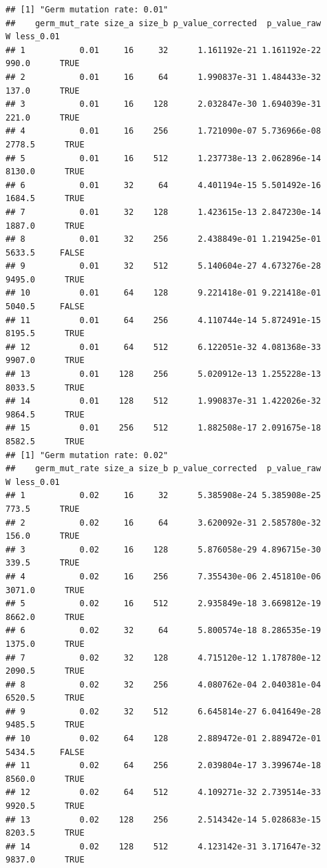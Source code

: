 \documentclass[
]{book}
\begin{document}
\begin{verbatim}
## [1] "Germ mutation rate: 0.01"
##    germ_mut_rate size_a size_b p_value_corrected  p_value_raw      W less_0.01
## 1           0.01     16     32      1.161192e-21 1.161192e-22  990.0      TRUE
## 2           0.01     16     64      1.990837e-31 1.484433e-32  137.0      TRUE
## 3           0.01     16    128      2.032847e-30 1.694039e-31  221.0      TRUE
## 4           0.01     16    256      1.721090e-07 5.736966e-08 2778.5      TRUE
## 5           0.01     16    512      1.237738e-13 2.062896e-14 8130.0      TRUE
## 6           0.01     32     64      4.401194e-15 5.501492e-16 1684.5      TRUE
## 7           0.01     32    128      1.423615e-13 2.847230e-14 1887.0      TRUE
## 8           0.01     32    256      2.438849e-01 1.219425e-01 5633.5     FALSE
## 9           0.01     32    512      5.140604e-27 4.673276e-28 9495.0      TRUE
## 10          0.01     64    128      9.221418e-01 9.221418e-01 5040.5     FALSE
## 11          0.01     64    256      4.110744e-14 5.872491e-15 8195.5      TRUE
## 12          0.01     64    512      6.122051e-32 4.081368e-33 9907.0      TRUE
## 13          0.01    128    256      5.020912e-13 1.255228e-13 8033.5      TRUE
## 14          0.01    128    512      1.990837e-31 1.422026e-32 9864.5      TRUE
## 15          0.01    256    512      1.882508e-17 2.091675e-18 8582.5      TRUE
## [1] "Germ mutation rate: 0.02"
##    germ_mut_rate size_a size_b p_value_corrected  p_value_raw      W less_0.01
## 1           0.02     16     32      5.385908e-24 5.385908e-25  773.5      TRUE
## 2           0.02     16     64      3.620092e-31 2.585780e-32  156.0      TRUE
## 3           0.02     16    128      5.876058e-29 4.896715e-30  339.5      TRUE
## 4           0.02     16    256      7.355430e-06 2.451810e-06 3071.0      TRUE
## 5           0.02     16    512      2.935849e-18 3.669812e-19 8662.0      TRUE
## 6           0.02     32     64      5.800574e-18 8.286535e-19 1375.0      TRUE
## 7           0.02     32    128      4.715120e-12 1.178780e-12 2090.5      TRUE
## 8           0.02     32    256      4.080762e-04 2.040381e-04 6520.5      TRUE
## 9           0.02     32    512      6.645814e-27 6.041649e-28 9485.5      TRUE
## 10          0.02     64    128      2.889472e-01 2.889472e-01 5434.5     FALSE
## 11          0.02     64    256      2.039804e-17 3.399674e-18 8560.0      TRUE
## 12          0.02     64    512      4.109271e-32 2.739514e-33 9920.5      TRUE
## 13          0.02    128    256      2.514342e-14 5.028683e-15 8203.5      TRUE
## 14          0.02    128    512      4.123142e-31 3.171647e-32 9837.0      TRUE

\end{verbatim}
\end{document}
